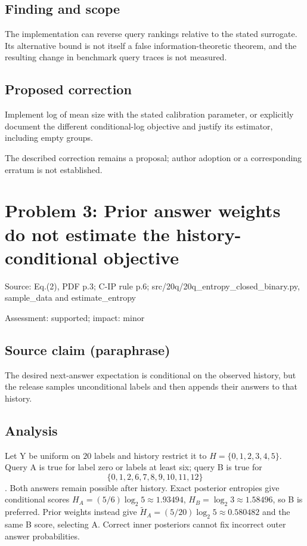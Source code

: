 \documentclass[11pt]{article}
\begin{document}
\subsection*{Finding and scope}

The implementation can reverse query rankings relative to the stated surrogate. Its alternative bound is not itself a false information-theoretic theorem, and the resulting change in benchmark query traces is not measured.

\subsection*{Proposed correction}

Implement log of mean size with the stated calibration parameter, or explicitly document the different conditional-log objective and justify its estimator, including empty groups.

The described correction remains a proposal; author adoption or a corresponding erratum is not established.

\section*{Problem 3: Prior answer weights do not estimate the history-conditional objective}

Source: Eq.(2), PDF p.3; C-IP rule p.6; src/20q/20q\_entropy\_closed\_binary.py, sample\_data and estimate\_entropy

Assessment: supported; impact: minor

\subsection*{Source claim (paraphrase)}

The desired next-answer expectation is conditional on the observed history, but the release samples unconditional labels and then appends their answers to that history.

\subsection*{Analysis}

Let Y be uniform on \(20\) labels and history restrict it to \(H=\{0,1,2,3,4,5\}\). Query A is true for label zero or labels at least six; query B is true for \[\{0,1,2,6,7,8,9,10,11,12\}\]. Both answers remain possible after history. Exact posterior entropies give conditional scores \(H_A=(5/6)\log_2 5\approx1.93494\), \(H_B=\log_2 3\approx1.58496\), so B is preferred. Prior weights instead give \(\widetilde H_A=(5/20)\log_2 5\approx0.580482\) and the same B score, selecting A. Correct inner posteriors cannot fix incorrect outer answer probabilities.
\end{document}
